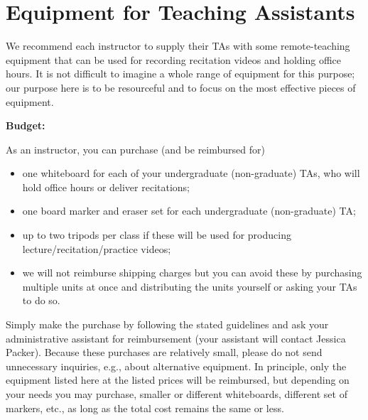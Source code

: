 \chapter{ Equipment for Teaching Assistants}


\begin{gram}
We recommend each instructor to supply their TAs with some
remote-teaching equipment that can be used for recording recitation
videos and holding office hours.
%
It is not difficult to imagine a whole range of equipment for this
purpose; our purpose here is to be resourceful and to focus on the most
effective pieces of equipment.
%

\textbf{Budget:}

As an instructor, you can purchase (and be reimbursed for)
\begin{itemize}
\item one whiteboard for each of your undergraduate (non-graduate) TAs, who will hold office hours or deliver recitations;


\item one board marker and eraser set for each undergraduate
  (non-graduate) TA;

\item
up to two tripods per class if these will be used for producing lecture/recitation/practice videos;

\item we will not reimburse shipping charges but you can avoid these by  purchasing multiple units at once and distributing the units yourself or asking your TAs to do so.

\end{itemize}

\end{gram}

\begin{important}[Reimbursement]
Simply make the purchase by following the stated guidelines and ask
your administrative assistant for reimbursement (your assistant will
contact Jessica Packer).
%
Because these purchases are relatively small, please do not send unnecessary inquiries, e.g., about alternative equipment.
%
In principle, only the equipment listed here at the listed prices will
be reimbursed, but depending on your needs you may purchase, smaller
or different whiteboards, different set of markers, etc.,  as long as the
total cost remains the same or less.
\end{important}


